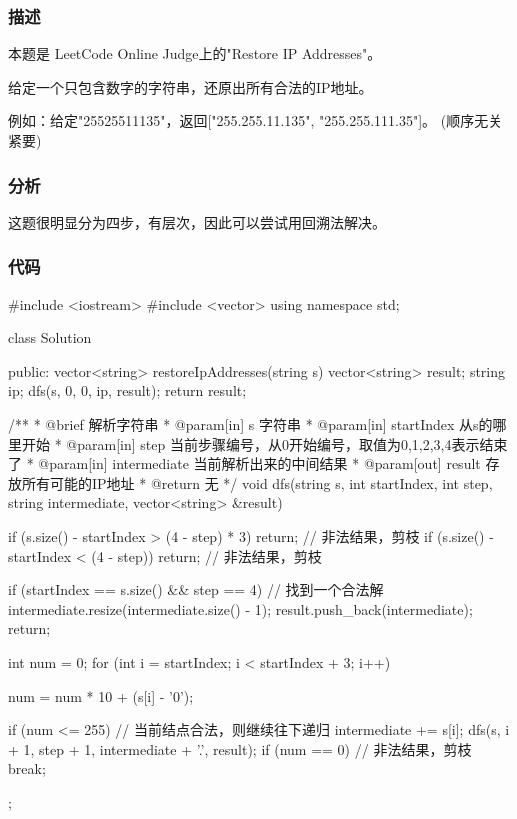 \subsubsection{描述}
本题是 LeetCode Online Judge上的"Restore IP Addresses"。

给定一个只包含数字的字符串，还原出所有合法的IP地址。

例如：给定"25525511135"，返回["255.255.11.135", "255.255.111.35"]。 (顺序无关紧要)

\subsubsection{分析}
这题很明显分为四步，有层次，因此可以尝试用回溯法解决。

\subsubsection{代码}
\begin{Codex}[label=restore_ip_adresses.cpp]
#include <iostream>
#include <vector>
using namespace std;

class Solution {
public:
    vector<string> restoreIpAddresses(string s) {
        vector<string> result;
        string ip;
        dfs(s, 0, 0, ip, result);
        return result;
    }

    /**
     * @brief 解析字符串
     * @param[in] s 字符串
     * @param[in] startIndex 从s的哪里开始
     * @param[in] step 当前步骤编号，从0开始编号，取值为0,1,2,3,4表示结束了
     * @param[in] intermediate 当前解析出来的中间结果
     * @param[out] result 存放所有可能的IP地址
     * @return 无
     */
    void dfs(string s, int startIndex, int step, string intermediate,
            vector<string> &result) {
        if (s.size() - startIndex > (4 - step) * 3)
            return;  // 非法结果，剪枝
        if (s.size() - startIndex < (4 - step))
            return;  // 非法结果，剪枝

        if (startIndex == s.size() && step == 4) {  // 找到一个合法解
            intermediate.resize(intermediate.size() - 1);
            result.push_back(intermediate);
            return;
        }

        int num = 0;
        for (int i = startIndex; i < startIndex + 3; i++) {
            num = num * 10 + (s[i] - '0');

            if (num <= 255) {  // 当前结点合法，则继续往下递归
                intermediate += s[i];
                dfs(s, i + 1, step + 1, intermediate + '.', result);
            }
            if (num == 0) {  // 非法结果，剪枝
                break;
            }
        }
    }
};
\end{Codex}


